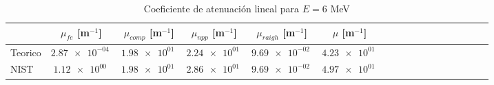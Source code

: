 \begin{table}
\caption{Coeficiente de atenuación lineal para $E=6$ MeV}
\begin{tabular}{lcccccccccccccccc}
\toprule
 & $\mu_{fe}$ [m$^{-1}$] & $\mu_{comp}$ [m$^{-1}$] & $\mu_{npp}$ [m$^{-1}$] & $\mu_{raigh}$ [m$^{-1}$] & $\mu$ [m$^{-1}$] \\
\midrule
Teorico & $\SI{2.87e-04}{}$ & $\SI{1.98e+01}{}$ & $\SI{2.24e+01}{}$ & $\SI{9.69e-02}{}$ & $\SI{4.23e+01}{}$ \\
NIST & $\SI{1.12e+00}{}$ & $\SI{1.98e+01}{}$ & $\SI{2.86e+01}{}$ & $\SI{9.69e-02}{}$ & $\SI{4.97e+01}{}$ \\
\bottomrule
\end{tabular}
\end{table}
